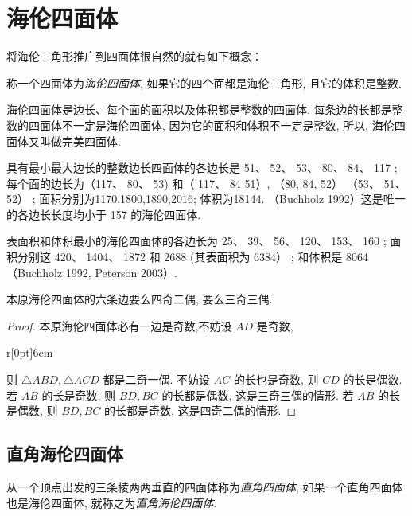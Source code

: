 \documentclass[12pt]{article}
\begin{document}
\section{海伦四面体}
将海伦三角形推广到四面体很自然的就有如下概念：
\begin{definition}
    称一个四面体为\emph{海伦四面体}, 如果它的四个面都是海伦三角形, 且它的体积是整数. 
\end{definition}

海伦四面体是边长、每个面的面积以及体积都是整数的四面体. 每条边的长都是整数的四面体不一定是海伦四面体, 因为它的面积和体积不一定是整数, 所以, 海伦四面体又叫做完美四面体. 

具有最小最大边长的整数边长四面体的各边长是 51、 52、 53、 80、 84、 117 ; 每个面的边长为（117、 80、 53) 和（ 117、 84 51）, （80, 84, 52） （53、 51、 52） ; 面积分别为1170,1800,1890,2016; 体积为18144. （Buchholz 1992）这是唯一的各边长长度均小于 157 的海伦四面体. 

表面积和体积最小的海伦四面体的各边长为 25、 39、 56、 120、 153、 160 ; 面积分别这 420、 1404、 1872 和 2688 (其表面积为 6384） ; 和体积是 8064 （Buchholz 1992, Peterson 2003）. 


\begin{theorem}
    本原海伦四面体的六条边要么四奇二偶, 要么三奇三偶. 
\end{theorem}
\begin{proof}
本原海伦四面体必有一边是奇数,不妨设 $AD$ 是奇数, 
\begin{wrapfigure}[5]{r}[0pt]{6cm}\end{wrapfigure}
则 $\triangle ABD, \triangle ACD$ 都是二奇一偶. 不妨设 $AC$ 的长也是奇数, 则 $CD$ 的长是偶数. 若 $AB$ 的长是奇数, 则 $BD,BC$ 的长都是偶数, 
这是三奇三偶的情形. 若 $AB$ 的长是偶数, 则 $BD,BC$ 的长都是奇数, 这是四奇二偶的情形. \par
\end{proof}
  
\subsection{直角海伦四面体}
\begin{definition}
   从一个顶点出发的三条棱两两垂直的四面体称为\emph{直角四面体}, 如果一个直角四面体也是海伦四面体, 就称之为\emph{直角海伦四面体}. 
\end{definition}
\end{document}
